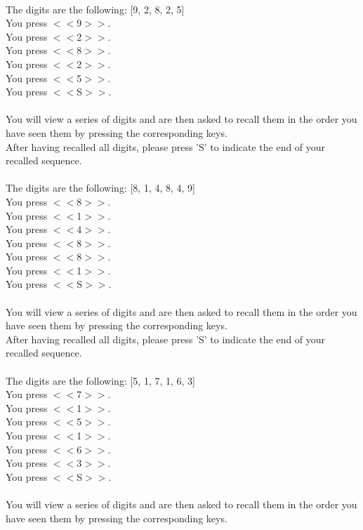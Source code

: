 \documentclass[pdflatex,sn-nature]{sn-jnl}%
\theoremstyle{thmstyleone}%
\theoremstyle{thmstyletwo}%
\theoremstyle{thmstylethree}%
\begin{document}
 $~$\\ 
The digits are the following: [9, 2, 8, 2, 5] $~$\\ 
You press $<<$9$>>$. $~$\\ 
You press $<<$2$>>$. $~$\\ 
You press $<<$8$>>$. $~$\\ 
You press $<<$2$>>$. $~$\\ 
You press $<<$5$>>$. $~$\\ 
You press $<<$S$>>$.  $~$\\ 
 $~$\\ 
You will view a series of digits and are then asked to recall them in the order you have seen them by pressing the corresponding keys. $~$\\ 
After having recalled all digits, please press 'S' to indicate the end of your recalled sequence. $~$\\ 
 $~$\\ 
The digits are the following: [8, 1, 4, 8, 4, 9] $~$\\ 
You press $<<$8$>>$. $~$\\ 
You press $<<$1$>>$. $~$\\ 
You press $<<$4$>>$. $~$\\ 
You press $<<$8$>>$. $~$\\ 
You press $<<$8$>>$. $~$\\ 
You press $<<$1$>>$. $~$\\ 
You press $<<$S$>>$.  $~$\\ 
 $~$\\ 
You will view a series of digits and are then asked to recall them in the order you have seen them by pressing the corresponding keys. $~$\\ 
After having recalled all digits, please press 'S' to indicate the end of your recalled sequence. $~$\\ 
 $~$\\ 
The digits are the following: [5, 1, 7, 1, 6, 3] $~$\\ 
You press $<<$7$>>$. $~$\\ 
You press $<<$1$>>$. $~$\\ 
You press $<<$5$>>$. $~$\\ 
You press $<<$1$>>$. $~$\\ 
You press $<<$6$>>$. $~$\\ 
You press $<<$3$>>$. $~$\\ 
You press $<<$S$>>$.  $~$\\ 
 $~$\\ 
You will view a series of digits and are then asked to recall them in the order you have seen them by pressing the corresponding keys. $~$\\ 
\end{document}
